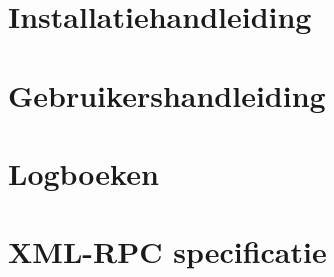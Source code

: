 \documentclass[a4paper,oneside,final]{memoir}
\begin{document}
\chapter{Installatiehandleiding}
\label{chap:installatie}


\chapter{Gebruikershandleiding}
\label{chap:handleiding}


\chapter{Logboeken}
\label{chap:logboeken}


\chapter{XML-RPC specificatie}
\label{chap:xmlrpc}

\end{document}
